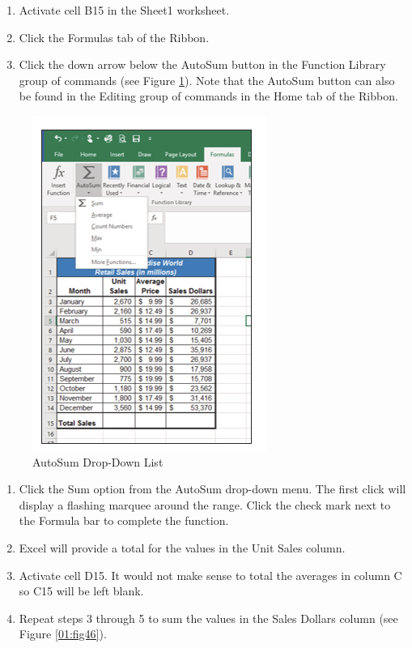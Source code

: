\begin{enumerate}
	\item Activate cell \textsf{B15} in the Sheet1 worksheet.
	\item Click the Formulas tab of the Ribbon.
	\item Click the down arrow below the AutoSum button in the Function Library group of commands (see Figure \ref{01:fig45}). Note that the AutoSum button can also be found in the Editing group of commands in the Home tab of the Ribbon.
\end{enumerate}

\begin{figure}[H]
	\centering
	\includegraphics[width=\maxwidth{.95\linewidth}]{gfx/ch01_fig45}
	\caption{AutoSum Drop-Down List}
	\label{01:fig45}
\end{figure}

\begin{enumerate}[resume]
	\item Click the Sum option from the AutoSum drop-down menu. The first click will display a flashing marquee around the range. Click the check mark next to the Formula bar to complete the function.
	\item Excel will provide a total for the values in the Unit Sales column.
	\item Activate cell \textsf{D15}. It would not make sense to total the averages in column \textsf{C} so \textsf{C15} will be left blank.
	\item Repeat steps 3 through 5 to sum the values in the Sales Dollars column (see Figure \ref{01:fig46}).
\end{enumerate}

